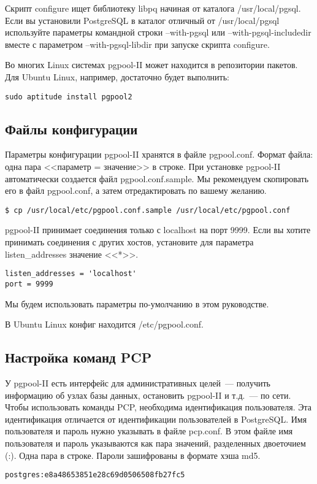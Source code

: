 Скрипт configure ищет библиотеку libpq начиная от каталога /usr/local/pgsql. Если вы установили PostgreSQL в каталог 
отличный от /usr/local/pgsql используйте параметры командной строки --with-pgsql или --with-pgsql-includedir вместе с 
параметром --with-pgsql-libdir при запуске скрипта configure.

Во многих Linux системах pgpool-II может находится в репозитории пакетов. 
Для Ubuntu Linux, например, достаточно будет выполнить:
\begin{verbatim}
sudo aptitude install pgpool2
\end{verbatim}

\subsection{Файлы конфигурации}
Параметры конфигурации pgpool-II хранятся в файле pgpool.conf. Формат файла: одна пара <<параметр = значение>> в строке. 
При установке pgpool-II автоматически создается файл pgpool.conf.sample. Мы рекомендуем скопировать его в файл pgpool.conf, 
а затем отредактировать по вашему желанию.
\begin{verbatim}
$ cp /usr/local/etc/pgpool.conf.sample /usr/local/etc/pgpool.conf
\end{verbatim}

pgpool-II принимает соединения только с localhost на порт 9999. Если вы хотите принимать соединения с других хостов, 
установите для параметра listen\_addresses значение <<*>>.
\begin{verbatim}
listen_addresses = 'localhost'
port = 9999
\end{verbatim}

Мы будем использовать параметры по-умолчанию в этом руководстве.

В Ubuntu Linux конфиг находится /etc/pgpool.conf.

\subsection{Настройка команд PCP}
У pgpool-II есть интерфейс для административных целей~--- получить информацию об узлах базы данных, 
остановить pgpool-II и т.д.~--- по сети. Чтобы использовать команды PCP, необходима идентификация пользователя. 
Эта идентификация отличается от идентификации пользователей в PostgreSQL. Имя пользователя и пароль нужно указывать в 
файле pcp.conf. В этом файле имя пользователя и пароль указываются как пара значений, разделенных двоеточием (:). 
Одна пара в строке. Пароли зашифрованы в формате хэша md5.
\begin{verbatim}
postgres:e8a48653851e28c69d0506508fb27fc5
\end{verbatim}

